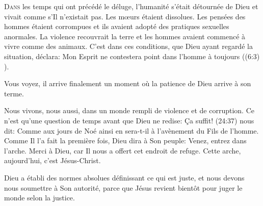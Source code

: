 \dvrule









\lettrine{D}{ans} les temps qui ont précédé le déluge, l'humanité s'était
 détournée de Dieu et vivait comme s'Il n'existait pas. Les m\oe{}urs étaient
 dissolues. Les pensées des hommes étaient corrompues et ils avaient adopté
 des pratiques sexuelles anormales. La violence recouvrait la terre et les
 hommes avaient commencé à vivre comme des animaux. C'est dans ces conditions,
 que Dieu ayant regardé la situation, déclara: \Og Mon Esprit
 ne contestera point dans l'homme à toujours \Fg{} ((6:3) \Ostervald{}). 

Vous voyez, il arrive finalement un moment où la patience de Dieu arrive à son terme. 

Nous vivons, nous aussi, dans un monde rempli de violence et de corruption.
 Ce n'est qu'une question de temps avant que Dieu ne redise: \Og Ça suffit! \Fg{} 
 (24:37) nous dit: \Og Comme aux jours de Noé ainsi en sera-t-il
 à l'avènement du Fils de l'homme.\Fg{} Comme Il l'a fait la première fois, Dieu
 dira à Son peuple: \Og Venez, entrez dans l'arche. \Fg{} Merci à Dieu, car Il
 nous a offert cet endroit de refuge. Cette arche, aujourd'hui, c'est Jésus-Christ.



Dieu a établi des normes absolues définissant ce qui est juste, et nous devons
 nous soumettre à Son autorité, parce que Jésus revient bientôt pour juger le
 monde selon la justice.

\dvrule


